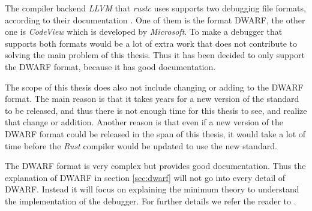 

The compiler backend \emph{LLVM} that \emph{rustc} uses supports two debugging file formats, according to their documentation \cite{llvm-dbs}.
One of them is the format \gls{DWARF}, the other one is \emph{CodeView} which is developed by \emph{Microsoft}.
To make a debugger that supports both formats would be a lot of extra work that does not contribute to solving the main problem of this thesis.
Thus it has been decided to only support the \gls{DWARF} format, because it has good documentation.


The scope of this thesis does also not include changing or adding to the \gls{DWARF} format.
The main reason is that it takes years for a new version of the standard to be released, and thus there is not enough time for this thesis to see, and realize that change or addition.
Another reason is that even if a new version of the \gls{DWARF} format could be released in the span of this thesis, it would take a lot of time before the \emph{Rust} compiler would be updated to use the new standard.


The \gls{DWARF} format is very complex but provides good documentation.
Thus the explanation of \gls{DWARF} in section \ref{sec:dwarf} will not go into every detail of \gls{DWARF}.
Instead it will focus on explaining the minimum theory to understand the implementation of the debugger.
For further details we refer the reader to \cite{dwarf}.


